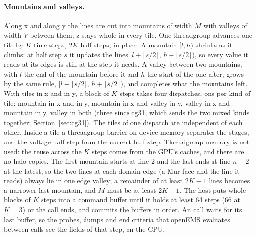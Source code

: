 \paragraph{Mountains and valleys.} Along x and along y the lines are cut into mountains of width $M$ with valleys of
width $V$ between them; z stays whole in every tile. One threadgroup advances one tile by $K$ time steps, $2K$ half
steps, in place. A mountain $[l,h)$ shrinks as it climbs: at half step $s$ it updates the lines
$[l+\lfloor s/2\rfloor,\,h-\lceil s/2\rceil)$, so every value it reads at its edges is still at the step it needs. A
valley between two mountains, with $l$ the end of the mountain before it and $h$ the start of the one after, grows by
the same rule, $[l-\lceil s/2\rceil,\,h+\lfloor s/2\rfloor)$, and completes what the mountains left. With tiles in x
and in y, a block of $K$ steps takes four dispatches, one per kind of tile: mountain in x and in y, mountain in x and
valley in y, valley in x and mountain in y, valley in both (three since cg31, which sends the two mixed kinds
together; Section~\ref{sec:cg31}). The tiles of one dispatch are independent of each other.
Inside a tile a threadgroup barrier on device memory separates the stages, and the voltage half step from the current
half step. Threadgroup memory is not used: the reuse across the $K$ steps comes from the GPU's caches, and there are
no halo copies. The first mountain starts at line 2 and the last ends at line $n-2$ at the latest, so the two lines at
each domain edge (a Mur face and the line it reads) always lie in one edge valley; a remainder of at least $2K-1$
lines becomes a narrower last mountain, and $M$ must be at least $2K-1$. The host puts whole blocks of $K$ steps into
a command buffer until it holds at least 64 steps (66 at $K=3$) or the call ends, and commits the buffers in order.
An  call waits for its last buffer, so the
probes, dumps and end criteria that openEMS evaluates between calls see the fields of that step, on the CPU.

